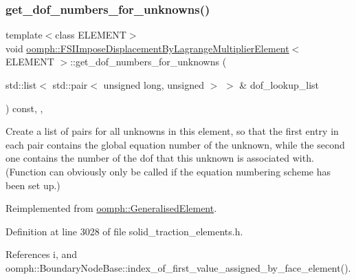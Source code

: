 \subsubsection{\texorpdfstring{get\+\_\+dof\+\_\+numbers\+\_\+for\+\_\+unknowns()}{get\_dof\_numbers\_for\_unknowns()}}
{\footnotesize\ttfamily template$<$class E\+L\+E\+M\+E\+NT$>$ \\
void \hyperlink{classoomph_1_1FSIImposeDisplacementByLagrangeMultiplierElement}{oomph\+::\+F\+S\+I\+Impose\+Displacement\+By\+Lagrange\+Multiplier\+Element}$<$ E\+L\+E\+M\+E\+NT $>$\+::get\+\_\+dof\+\_\+numbers\+\_\+for\+\_\+unknowns (\begin{DoxyParamCaption}\item[{std\+::list$<$ std\+::pair$<$ unsigned long, unsigned $>$ $>$ \&}]{dof\+\_\+lookup\+\_\+list }\end{DoxyParamCaption}) const\hspace{0.3cm}{\ttfamily [inline]}, {\ttfamily [protected]}, {\ttfamily [virtual]}}



Create a list of pairs for all unknowns in this element, so that the first entry in each pair contains the global equation number of the unknown, while the second one contains the number of the dof that this unknown is associated with. (Function can obviously only be called if the equation numbering scheme has been set up.) 



Reimplemented from \hyperlink{classoomph_1_1GeneralisedElement_a069f59bfc3e607a5bebba52c6314d777}{oomph\+::\+Generalised\+Element}.



Definition at line 3028 of file solid\+\_\+traction\+\_\+elements.\+h.



References i, and oomph\+::\+Boundary\+Node\+Base\+::index\+\_\+of\+\_\+first\+\_\+value\+\_\+assigned\+\_\+by\+\_\+face\+\_\+element().

\mbox{\label{classoomph_1_1FSIImposeDisplacementByLagrangeMultiplierElement_ad34707237f7a7bdeb3b89cff465ecb67}} 
